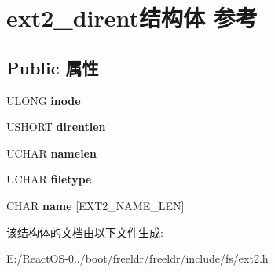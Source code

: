 \hypertarget{structext2__dirent}{}\section{ext2\+\_\+dirent结构体 参考}
\label{structext2__dirent}
\subsection*{Public 属性}
\begin{DoxyCompactItemize}
\item 
\mbox{\label{structext2__dirent_a2e41cb4ce6b9ce2018843c62619109b4}} 
U\+L\+O\+NG {\bfseries inode}
\item 
\mbox{\label{structext2__dirent_aba4d3d3afbf10c3737117ec64c2e1401}} 
U\+S\+H\+O\+RT {\bfseries direntlen}
\item 
\mbox{\label{structext2__dirent_a2bf2b20a0f6b03efd461d4d8bccb3011}} 
U\+C\+H\+AR {\bfseries namelen}
\item 
\mbox{\label{structext2__dirent_a5c9b828f1913240c4f7f28800e64974e}} 
U\+C\+H\+AR {\bfseries filetype}
\item 
\mbox{\label{structext2__dirent_a711be76459c9d3cd7d2091ba10b25c90}} 
C\+H\+AR {\bfseries name} \mbox{[}E\+X\+T2\+\_\+\+N\+A\+M\+E\+\_\+\+L\+EN\mbox{]}
\end{DoxyCompactItemize}


该结构体的文档由以下文件生成\+:\begin{DoxyCompactItemize}
\item 
E\+:/\+React\+O\+S-\/0../boot/freeldr/freeldr/include/fs/ext2.\+h\end{DoxyCompactItemize}
